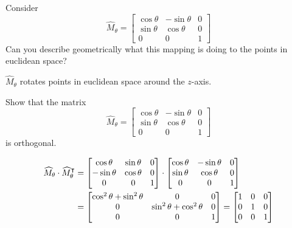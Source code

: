 \documentclass[newpage,hints,handout]{ximera}
\begin{document}
\begin{problem}
  Consider
  \[
  \hat{M}_\theta=\begin{bmatrix}
  \cos\theta & -\sin\theta & 0\\
  \sin\theta & \cos\theta & 0\\
  0 & 0 & 1
  \end{bmatrix}
  \]
  Can you describe geometrically what this mapping is doing
  to the points in euclidean space?


\begin{freeResponse}
$\hat{M}_\theta$ rotates points in euclidean space around the $z$-axis. 
\end{freeResponse}
\end{problem}


\begin{problem}
\label{14} Show that the matrix%
\[
\hat{M}_\theta=\begin{bmatrix}
\cos\theta & -\sin\theta & 0\\
\sin\theta & \cos\theta & 0\\
0 & 0 & 1
\end{bmatrix}
\]
is orthogonal. 

\begin{freeResponse}
\begin{align*}
\widehat{M}_\theta \cdot \widehat{M}_\theta^\intercal 
	&= \begin{bmatrix}
	\cos\theta & \sin\theta & 0 \\
	-\sin\theta & \cos\theta & 0 \\
	0 & 0 & 1
	\end{bmatrix} \cdot
	\begin{bmatrix}
	\cos\theta & -\sin\theta & 0 \\
	\sin\theta & \cos\theta & 0 \\
	0 & 0 & 1
	\end{bmatrix} \\
	&= \begin{bmatrix}
	\cos^{2}\theta + \sin^{2} \theta & 0 & 0 \\
	0 &  \sin^{2} \theta + \cos^{2}\theta  & 0 \\
	0 & 0 & 1
	\end{bmatrix}
	=  \begin{bmatrix}
	1 & 0 & 0 \\
	0 & 1  & 0 \\
	0 & 0 & 1
	\end{bmatrix}
\end{align*}
\end{freeResponse}
\end{problem}
\end{document}
